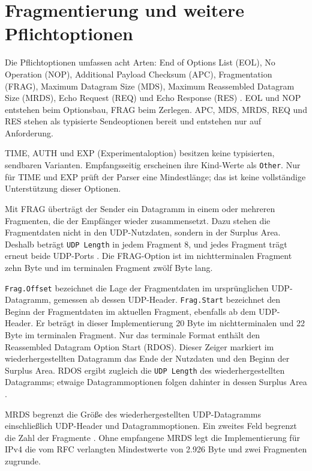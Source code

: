 \section{Fragmentierung und weitere Pflichtoptionen}
\label{sec:optionsverarbeitung}

Die Pflichtoptionen umfassen acht Arten: End of Options List (EOL), No Operation (NOP), Additional Payload
Checksum (APC), Fragmentation (FRAG), Maximum Datagram Size (MDS), Maximum Reassembled Datagram Size
(MRDS), Echo Request (REQ) und Echo Response (RES) \cite[Sec.~10]{rfc9868}. EOL und NOP entstehen
beim Optionsbau, FRAG beim Zerlegen. APC, MDS, MRDS, REQ und RES stehen als typisierte Sendeoptionen
bereit und entstehen nur auf Anforderung.

TIME, AUTH und EXP (Experimentaloption) besitzen keine typisierten, sendbaren Varianten. Empfangsseitig
erscheinen ihre Kind-Werte als \texttt{Other}. Nur für TIME und EXP prüft der Parser eine Mindestlänge;
das ist keine vollständige Unterstützung dieser Optionen.

Mit FRAG überträgt der Sender ein Datagramm in einem oder mehreren Fragmenten, die der Empfänger
wieder zusammensetzt. Dazu stehen die Fragmentdaten nicht in den UDP-Nutzdaten, sondern in der Surplus
Area. Deshalb beträgt \texttt{UDP Length} in jedem Fragment 8, und jedes Fragment trägt erneut beide
UDP-Ports \cite[Sec.~11.4]{rfc9868}. Die FRAG-Option ist im nichtterminalen Fragment zehn Byte und im
terminalen Fragment zwölf Byte lang.

\texttt{Frag.Offset} bezeichnet die Lage der Fragmentdaten im ursprünglichen UDP-Datagramm, gemessen
ab dessen UDP-Header. \texttt{Frag.Start} bezeichnet den Beginn der Fragmentdaten im aktuellen Fragment,
ebenfalls ab dem UDP-Header. Er beträgt in dieser Implementierung 20 Byte im nichtterminalen und 22 Byte
im terminalen Fragment. Nur das terminale Format enthält den Reassembled Datagram Option Start (RDOS). Dieser Zeiger
markiert im wiederhergestellten Datagramm das Ende der Nutzdaten und den Beginn der Surplus Area.
RDOS ergibt zugleich die \texttt{UDP Length} des wiederhergestellten Datagramms; etwaige
Datagrammoptionen folgen dahinter in dessen Surplus Area \cite[Sec.~11.4]{rfc9868}.

MRDS begrenzt die Größe des wiederhergestellten UDP-Datagramms einschließlich UDP-Header und
Datagrammoptionen. Ein zweites Feld begrenzt die Zahl der Fragmente \cite[Sec.~11.6]{rfc9868}. Ohne
empfangene MRDS legt die Implementierung für IPv4 die vom RFC verlangten Mindestwerte von 2.926 Byte
und zwei Fragmenten zugrunde.

